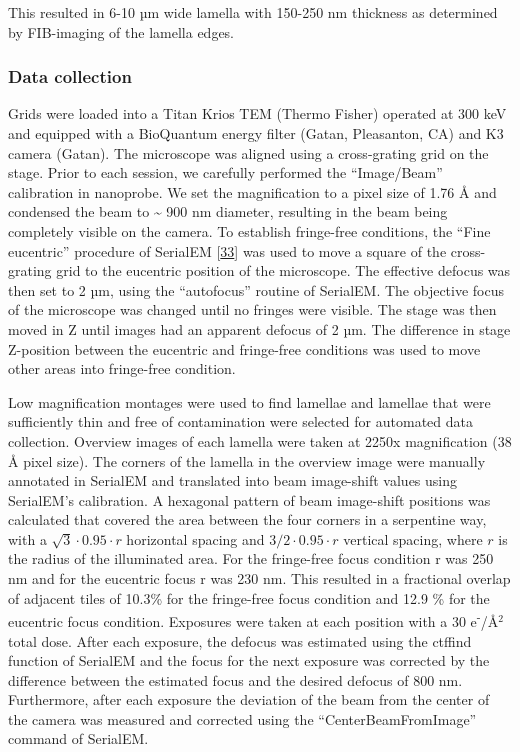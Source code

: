 \documentclass[
]{article}
\begin{document}
This resulted in 6-10 µm wide lamella with 150-250 nm thickness as
determined by FIB-imaging of the lamella edges.

\hypertarget{data-collection}{%
\subsubsection{Data collection}\label{data-collection}}

Grids were loaded into a Titan Krios TEM (Thermo Fisher) operated at 300
keV and equipped with a BioQuantum energy filter (Gatan, Pleasanton, CA)
and K3 camera (Gatan). The microscope was aligned using a cross-grating
grid on the stage. Prior to each session, we carefully performed the
``Image/Beam'' calibration in nanoprobe. We set the magnification to a
pixel size of 1.76 Å and condensed the beam to \textasciitilde{} 900 nm diameter,
resulting in the beam being completely visible on the camera. To
establish fringe-free conditions, the ``Fine eucentric'' procedure of
SerialEM {[}\protect\hyperlink{ref-19ZFerhph}{33}{]} was used to move a square of
the cross-grating grid to the eucentric position of the microscope. The
effective defocus was then set to 2 µm, using the ``autofocus'' routine of
SerialEM. The objective focus of the microscope was changed until no
fringes were visible. The stage was then moved in Z until images had an
apparent defocus of 2 µm. The difference in stage Z-position between the
eucentric and fringe-free conditions was used to move other areas into
fringe-free condition.

Low magnification montages were used to find lamellae and lamellae that
were sufficiently thin and free of contamination were selected for
automated data collection. Overview images of each lamella were taken at
2250x magnification (38 Å pixel size). The corners of the lamella in the
overview image were manually annotated in SerialEM and translated into
beam image-shift values using SerialEM's calibration. A hexagonal
pattern of beam image-shift positions was calculated that covered the
area between the four corners in a serpentine way, with a
\(\sqrt{3}\cdot 0.95 \cdot r\) horizontal spacing and
\(3/2\cdot 0.95 \cdot r\) vertical spacing, where \(r\) is the radius of the
illuminated area. For the fringe-free focus condition r was 250 nm and
for the eucentric focus r was 230 nm. This resulted in a fractional
overlap of adjacent tiles of 10.3\% for the fringe-free focus condition
and 12.9 \% for the eucentric focus condition. Exposures were taken at
each position with a 30 e\textsuperscript{-}/Å\(^2\) total dose. After each exposure, the
defocus was estimated using the ctffind function of SerialEM and the
focus for the next exposure was corrected by the difference between the
estimated focus and the desired defocus of 800 nm. Furthermore, after
each exposure the deviation of the beam from the center of the camera
was measured and corrected using the ``CenterBeamFromImage'' command of
SerialEM.
\end{document}
